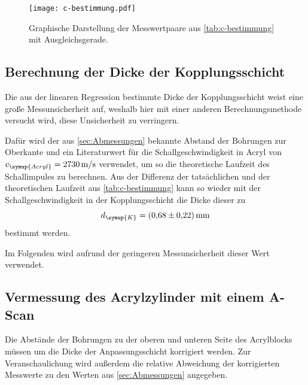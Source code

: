 \begin{figure}[H]
    \centering
    \texttt{[image: c-bestimmung.pdf]}
    \caption{Graphische Darstellung der Messwertpaare aus \autoref{tab:c-bestimmung} mit Ausgleichsgerade.}
    \label{fig:c-bestimmung}
  \end{figure}

\subsection{Berechnung der Dicke der Kopplungsschicht}
Die aus der linearen Regression bestimmte Dicke der Kopplungsschicht weist eine große Messunsicherheit auf, weshalb hier mit einer anderen
Berechnungsmethode versucht wird, diese Unsicherheit zu verringern.

Dafür wird der aus \ref{sec:Abmessungen} bekannte Abstand der Bohrungen zur Oberkante und ein Literaturwert für die Schallgeschwindigkeit
in Acryl von $c_{\symup{Acryl}} = \qty{2730}{\metre\per\second}$ \cite{c_Acryl} verwendet, um so die theoretische Laufzeit des Schallimpules 
zu berechnen. Aus der Differenz der tatsächlichen und der theoretischen Laufzeit aus \autoref{tab:c-bestimmung} kann so wieder mit der 
Schallgeschwindigkeit in der Kopplungsschicht die Dicke dieser zu
\begin{equation*}
    d_{\symup{K}} = \qty{0.68+-0.22}{\milli\metre}
\end{equation*}
bestimmt werden.

Im Folgenden wird aufrund der geringeren Messunsicherheit dieser Wert verwendet.

\subsection{Vermessung des Acrylzylinder mit einem A-Scan}
\label{sec:a-scan}
Die Abstände der Bohrungen zu der oberen und unteren Seite des Acrylblocks müssen um die Dicke der Anpassungsschicht korrigiert werden. 
Zur Veranschaulichung wird außerdem die relative Abweichung der korrigierten Messwerte zu den Werten aus \ref{sec:Abmessungen} angegeben.

